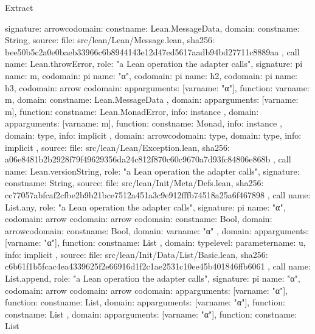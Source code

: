 \begin{lexlean}{Extract}
\begin{toolingmodule}
{{      signature: arrow{codomain: const{name: Lean.MessageData}, domain: const{name: String}},
      source: {
        file: src/lean/Lean/Message.lean,
        sha256: bee50b5c2a0e0baeb33966c6b8944143e12d47ed5617aadb94bd27711c8889aa
      }
    },
    call{
      name: Lean.throwError,
      role: "a Lean operation the adapter calls",
      signature: pi{
        name: m,
        codomain: pi{
          name: "α",
          codomain: pi{
            name: h2,
            codomain: pi{
              name: h3,
              codomain: arrow{
                codomain: app{arguments: [var{name: "α"}], function: var{name: m}},
                domain: const{name: Lean.MessageData}
              },
              domain: app{arguments: [var{name: m}], function: const{name: Lean.MonadError}},
              info: instance
            },
            domain: app{arguments: [var{name: m}], function: const{name: Monad}},
            info: instance
          },
          domain: type{},
          info: implicit
        },
        domain: arrow{codomain: type{}, domain: type{}},
        info: implicit
      },
      source: {
        file: src/lean/Lean/Exception.lean,
        sha256: a06e8481b2b2928f79f49629356da24c812f870c60c9670a7d93fc84806e868b
      }
    },
    call{
      name: Lean.versionString,
      role: "a Lean operation the adapter calls",
      signature: const{name: String},
      source: {
        file: src/lean/Init/Meta/Defs.lean,
        sha256: cc77057abfcaf2cfbe2b9b21bce7512a451a3c9e912fffb74518a25a6f467898
      }
    },
    call{
      name: List.any,
      role: "a Lean operation the adapter calls",
      signature: pi{
        name: "α",
        codomain: arrow{
          codomain: arrow{
            codomain: const{name: Bool},
            domain: arrow{codomain: const{name: Bool}, domain: var{name: "α"}}
          },
          domain: app{arguments: [var{name: "α"}], function: const{name: List}}
        },
        domain: type{level: parameter{name: u}},
        info: implicit
      },
      source: {
        file: src/lean/Init/Data/List/Basic.lean,
        sha256: c6b61f1b5fcac4ea4339625f2e66916d1f2c1ae2531c10ee45b401846ffb6061
      }
    },
    call{
      name: List.append,
      role: "a Lean operation the adapter calls",
      signature: pi{
        name: "α",
        codomain: arrow{
          codomain: arrow{
            codomain: app{arguments: [var{name: "α"}], function: const{name: List}},
            domain: app{arguments: [var{name: "α"}], function: const{name: List}}
          },
          domain: app{arguments: [var{name: "α"}], function: const{name: List}}
}}}}
\end{toolingmodule}
\end{lexlean}
